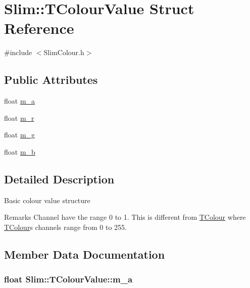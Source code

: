 \hypertarget{struct_slim_1_1_t_colour_value}{}\section{Slim\+:\+:T\+Colour\+Value Struct Reference}
\label{struct_slim_1_1_t_colour_value}


{\ttfamily \#include $<$Slim\+Colour.\+h$>$}

\subsection*{Public Attributes}
\begin{DoxyCompactItemize}
\item 
float \hyperlink{struct_slim_1_1_t_colour_value_ad736b855580ac2a8f8085b4c26a16a86}{m\+\_\+a}
\item 
float \hyperlink{struct_slim_1_1_t_colour_value_ac5fb73befbfd2ad8c6d988c194b04275}{m\+\_\+r}
\item 
float \hyperlink{struct_slim_1_1_t_colour_value_a6fe5baf5aeaee1cadfb247ffbadf1a5b}{m\+\_\+g}
\item 
float \hyperlink{struct_slim_1_1_t_colour_value_a7d9e36f3e2ae3fe06eef2defdcd4e43f}{m\+\_\+b}
\end{DoxyCompactItemize}


\subsection{Detailed Description}
Basic colour value structure \begin{DoxyRemark}{Remarks}
Channel have the range 0 to 1. This is different from \hyperlink{struct_slim_1_1_t_colour}{T\+Colour} where \hyperlink{struct_slim_1_1_t_colour}{T\+Colour}\textquotesingle{}s channels range from 0 to 255. 
\end{DoxyRemark}


\subsection{Member Data Documentation}
\hypertarget{struct_slim_1_1_t_colour_value_ad736b855580ac2a8f8085b4c26a16a86}{}
\subsubsection[{m\+\_\+a}]{\setlength{\rightskip}{0pt plus 5cm}float Slim\+::\+T\+Colour\+Value\+::m\+\_\+a}\label{struct_slim_1_1_t_colour_value_ad736b855580ac2a8f8085b4c26a16a86}
\hypertarget{struct_slim_1_1_t_colour_value_a7d9e36f3e2ae3fe06eef2defdcd4e43f}{}
